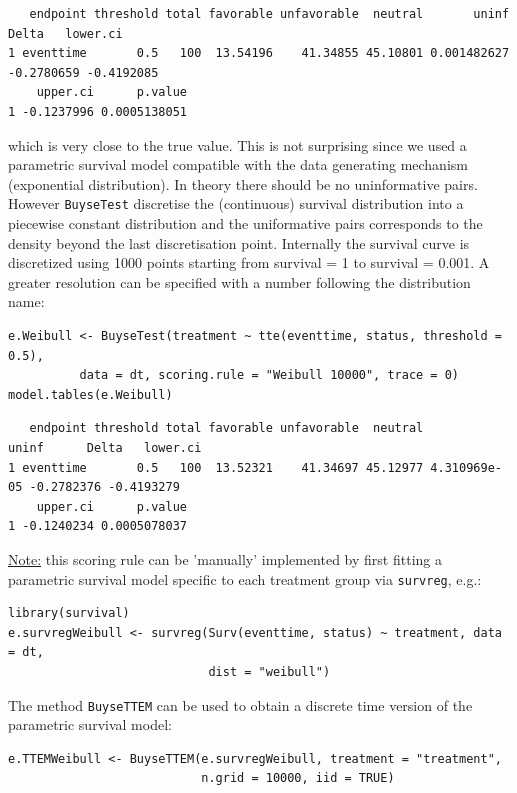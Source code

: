 \documentclass[12pt]{article}
\begin{document}
\begin{verbatim}
   endpoint threshold total favorable unfavorable  neutral       uninf      Delta   lower.ci
1 eventtime       0.5   100  13.54196    41.34855 45.10801 0.001482627 -0.2780659 -0.4192085
    upper.ci      p.value
1 -0.1237996 0.0005138051
\end{verbatim}


which is very close to the true value. This is not surprising since we
used a parametric survival model compatible with the data generating
mechanism (exponential distribution). In theory there should be no
uninformative pairs. However \texttt{BuyseTest} discretise the (continuous)
survival distribution into a piecewise constant distribution and the
uniformative pairs corresponds to the density beyond the last
discretisation point. Internally the survival curve is discretized
using 1000 points starting from survival = 1 to survival = 0.001. A
greater resolution can be specified with a number following the
distribution name:
\lstset{language=r,label= ,caption= ,captionpos=b,numbers=none}
\begin{lstlisting}
e.Weibull <- BuyseTest(treatment ~ tte(eventtime, status, threshold = 0.5),
          data = dt, scoring.rule = "Weibull 10000", trace = 0)
model.tables(e.Weibull)
\end{lstlisting}

\begin{verbatim}
   endpoint threshold total favorable unfavorable  neutral        uninf      Delta   lower.ci
1 eventtime       0.5   100  13.52321    41.34697 45.12977 4.310969e-05 -0.2782376 -0.4193279
    upper.ci      p.value
1 -0.1240234 0.0005078037
\end{verbatim}


\noindent \uline{Note:} this scoring rule can be 'manually' implemented by
first fitting a parametric survival model specific to each treatment
group via \texttt{survreg}, e.g.:
\lstset{language=r,label= ,caption= ,captionpos=b,numbers=none}
\begin{lstlisting}
library(survival)
e.survregWeibull <- survreg(Surv(eventtime, status) ~ treatment, data = dt, 
                            dist = "weibull")
\end{lstlisting}

The method \texttt{BuyseTTEM} can be used to obtain a discrete time version
of the parametric survival model:
\lstset{language=r,label= ,caption= ,captionpos=b,numbers=none}
\begin{lstlisting}
e.TTEMWeibull <- BuyseTTEM(e.survregWeibull, treatment = "treatment",
                           n.grid = 10000, iid = TRUE)

\end{lstlisting}
\end{document}
